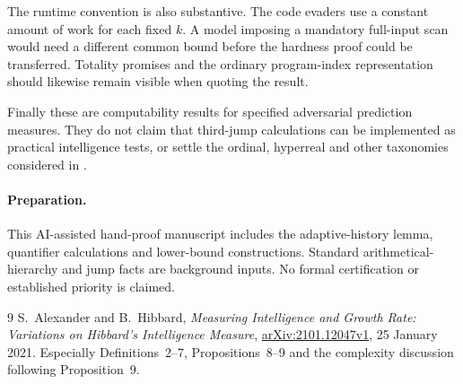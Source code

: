 \documentclass[11pt]{article}
\begin{document}
The runtime convention is also substantive. The code evaders use
a constant amount of work for each fixed $k$. A model imposing a
mandatory full-input scan would need a different common bound
before the hardness proof could be transferred. Totality promises
and the ordinary program-index representation should likewise remain
visible when quoting the result.

Finally these are computability results for specified adversarial
prediction measures. They do not claim that third-jump calculations
can be implemented as practical intelligence tests, or settle the
ordinal, hyperreal and other taxonomies considered in \cite{AH}.

\paragraph{Preparation.}
This AI-assisted hand-proof manuscript includes the adaptive-history
lemma, quantifier calculations and lower-bound constructions. Standard
arithmetical-hierarchy and jump facts are background inputs. No
formal certification or established priority is claimed.

\begin{thebibliography}{9}
 S.~Alexander and B.~Hibbard,
\emph{Measuring Intelligence and Growth Rate: Variations on Hibbard's
Intelligence Measure},
\href{https://arxiv.org/abs/2101.12047v1}{arXiv:2101.12047v1},
25 January 2021. Especially Definitions~2--7, Propositions~8--9 and
the complexity discussion following Proposition~9.
\end{thebibliography}
\end{document}
